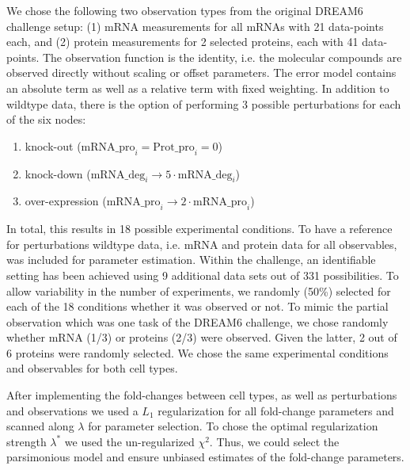 \documentclass{bioinfo}
\begin{document}
We chose the following two observation types from the original DREAM6 challenge setup:
(1) mRNA measurements for all mRNAs with 21 data-points each, and (2) protein measurements for 2 selected proteins, each with 41 data-points.
The observation function is the identity, i.e. the molecular compounds are observed directly without scaling or offset parameters.
The error model contains an absolute term as well as a relative term with fixed weighting.
In addition to wildtype data, there is the option of performing 3 possible perturbations for each of the six nodes:
\begin{enumerate}
\item knock-out ($\text{mRNA\_pro}_i=\text{Prot\_pro}_i=0$)
\item knock-down ($\text{mRNA\_deg}_i\rightarrow 5\cdot \text{mRNA\_deg}_i$)
\item over-expression ($\text{mRNA\_pro}_i \rightarrow 2\cdot \text{mRNA\_pro}_i$)
\end{enumerate}
In total, this results in 18 possible experimental conditions.
To have a reference for perturbations wildtype data, i.e. mRNA and protein data for all observables, was included for parameter estimation.
Within the challenge, an identifiable setting has been achieved using 9 additional data sets out of 331 possibilities.
To allow variability in the number of experiments, we randomly (50\%) selected for each of the 18 conditions whether it was observed or not.
To mimic the partial observation which was one task of the DREAM6 challenge, we chose randomly whether mRNA (1/3) or proteins (2/3) were observed.
Given the latter, 2 out of 6 proteins were randomly selected.
We chose the same experimental conditions and observables for both cell types.

After implementing the fold-changes between cell types, as well as perturbations and observations we used a $L_1$ regularization for all fold-change parameters and scanned along $\lambda$ for parameter selection.
To chose the optimal regularization strength $\lambda^*$ we used the un-regularized $\chi^2$.
Thus, we could select the parsimonious model and ensure unbiased estimates of the fold-change parameters.
\end{document}

